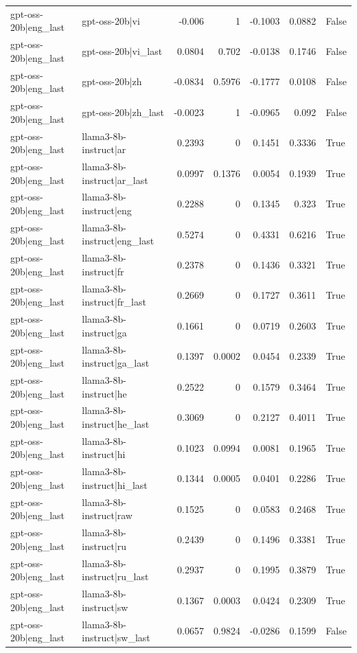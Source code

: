 \begin{table}
\begin{tabular}{l l r r r r l}
gpt-oss-20b|eng_last & gpt-oss-20b|vi & -0.006 & 1 & -0.1003 & 0.0882 & False \\
gpt-oss-20b|eng_last & gpt-oss-20b|vi_last & 0.0804 & 0.702 & -0.0138 & 0.1746 & False \\
gpt-oss-20b|eng_last & gpt-oss-20b|zh & -0.0834 & 0.5976 & -0.1777 & 0.0108 & False \\
gpt-oss-20b|eng_last & gpt-oss-20b|zh_last & -0.0023 & 1 & -0.0965 & 0.092 & False \\
gpt-oss-20b|eng_last & llama3-8b-instruct|ar & 0.2393 & 0 & 0.1451 & 0.3336 & True \\
gpt-oss-20b|eng_last & llama3-8b-instruct|ar_last & 0.0997 & 0.1376 & 0.0054 & 0.1939 & True \\
gpt-oss-20b|eng_last & llama3-8b-instruct|eng & 0.2288 & 0 & 0.1345 & 0.323 & True \\
gpt-oss-20b|eng_last & llama3-8b-instruct|eng_last & 0.5274 & 0 & 0.4331 & 0.6216 & True \\
gpt-oss-20b|eng_last & llama3-8b-instruct|fr & 0.2378 & 0 & 0.1436 & 0.3321 & True \\
gpt-oss-20b|eng_last & llama3-8b-instruct|fr_last & 0.2669 & 0 & 0.1727 & 0.3611 & True \\
gpt-oss-20b|eng_last & llama3-8b-instruct|ga & 0.1661 & 0 & 0.0719 & 0.2603 & True \\
gpt-oss-20b|eng_last & llama3-8b-instruct|ga_last & 0.1397 & 0.0002 & 0.0454 & 0.2339 & True \\
gpt-oss-20b|eng_last & llama3-8b-instruct|he & 0.2522 & 0 & 0.1579 & 0.3464 & True \\
gpt-oss-20b|eng_last & llama3-8b-instruct|he_last & 0.3069 & 0 & 0.2127 & 0.4011 & True \\
gpt-oss-20b|eng_last & llama3-8b-instruct|hi & 0.1023 & 0.0994 & 0.0081 & 0.1965 & True \\
gpt-oss-20b|eng_last & llama3-8b-instruct|hi_last & 0.1344 & 0.0005 & 0.0401 & 0.2286 & True \\
gpt-oss-20b|eng_last & llama3-8b-instruct|raw & 0.1525 & 0 & 0.0583 & 0.2468 & True \\
gpt-oss-20b|eng_last & llama3-8b-instruct|ru & 0.2439 & 0 & 0.1496 & 0.3381 & True \\
gpt-oss-20b|eng_last & llama3-8b-instruct|ru_last & 0.2937 & 0 & 0.1995 & 0.3879 & True \\
gpt-oss-20b|eng_last & llama3-8b-instruct|sw & 0.1367 & 0.0003 & 0.0424 & 0.2309 & True \\
gpt-oss-20b|eng_last & llama3-8b-instruct|sw_last & 0.0657 & 0.9824 & -0.0286 & 0.1599 & False \\

\end{tabular}
\end{table}
